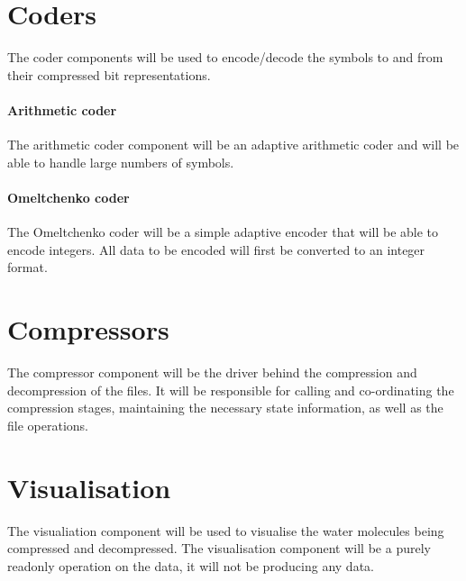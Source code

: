 

\section{Coders}
\label{sec:coders}

The coder components will be used to encode/decode the symbols to and from
their compressed bit representations.

\paragraph{Arithmetic coder}

The arithmetic coder component will be an adaptive arithmetic coder and will be
able to handle large numbers of symbols.


\paragraph{Omeltchenko coder}

The Omeltchenko coder will be a simple adaptive encoder that will be able to
encode integers. All data to be encoded will first be converted to an integer
format.



\section{Compressors}
\label{sec:compressors}

The compressor component will be the driver behind the compression and
decompression of the files. It will be responsible for calling and
co-ordinating the compression stages, maintaining the necessary state
information, as well as the file operations.


\section{Visualisation}
\label{sec:visualistioncomponent}

The visualiation component will be used to visualise the water molecules being
compressed and decompressed. The visualisation component will be a purely
readonly operation on the data, it will not be producing any data.


